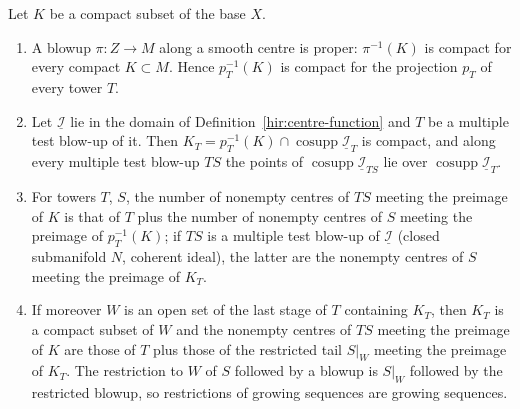 \begin{lemma}
\label{bcalc:tower-preimage-compact}
\mixedleanok
Let \(K\) be a compact subset of the base \(X\).
\begin{enumerate}
\item A blowup \(\pi\colon Z\to M\) along a smooth centre is proper: \(\pi^{-1}(K)\) is compact for every compact \(K\subset M\). Hence \(p_T^{-1}(K)\) is compact for the
projection \(p_T\) of every tower \(T\).
\item Let \(\underline{\mathcal I}\) lie in the domain of Definition~\ref{hir:centre-function} and \(T\) be a multiple test blow-up of it. Then
\(K_T=p_T^{-1}(K)\cap\operatorname{cosupp}\underline{\mathcal I}_T\) is compact, and along every multiple test blow-up \(TS\) the points of
\(\operatorname{cosupp}\underline{\mathcal I}_{TS}\) lie over \(\operatorname{cosupp}\underline{\mathcal I}_T\).
\item For towers \(T\), \(S\), the number of nonempty centres of \(TS\) meeting the preimage of \(K\) is that of \(T\) plus the number of nonempty centres of \(S\)
meeting the preimage of \(p_T^{-1}(K)\); if \(TS\) is a multiple test blow-up of \(\underline{\mathcal I}\) (closed submanifold \(N\), coherent ideal), the latter are the
nonempty centres of \(S\) meeting the preimage of \(K_T\).
\item If moreover \(W\) is an open set of the last stage of \(T\) containing \(K_T\), then \(K_T\) is a compact subset of \(W\) and the nonempty centres of \(TS\) meeting the
preimage of \(K\) are those of \(T\) plus those of the restricted tail \(S|_W\) meeting the preimage of \(K_T\). The restriction to \(W\) of \(S\) followed by a blowup is
\(S|_W\) followed by the restricted blowup, so restrictions of growing sequences are growing sequences.
\end{enumerate}
\end{lemma}
